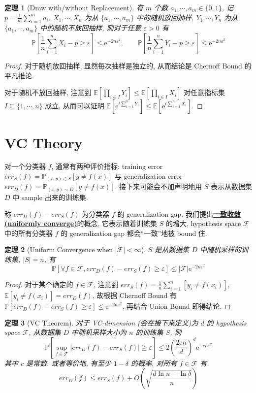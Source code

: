 \documentclass[8pt]{article}
\theoremstyle{compact}
\newtheorem{theorem}{定理}[section]
\def\obj#1{\textbf{\uline{#1}}}
\def\le{\leqslant}
\def\ge{\geqslant}
\def\P#1{\mathbb{P}\left[{#1}\right]}
\def\E#1{\mathbb{E}\left[{#1}\right]}
\def\e{\mathrm{e}}
\begin{document}
\begin{theorem}[Draw with/without Replacement]
	有 $m$ 个数 $a_1, \cdots, a_m \in \{0, 1\}$, 记 $p = \frac1m \sum\limits_{i=1}^{m}a_i$. $X_1, \cdots, X_n$ 为从 $\{a_1, \cdots, a_m\}$ 中的随机放回抽样, $Y_1, \cdots, Y_n$ 为从 $\{a_1, \cdots, a_m\}$ 中的随机不放回抽样, 则对于任意 $\varepsilon > 0$ 有
	$$\P{\frac1n \sum_{i=1}^{n}X_i - p \ge \varepsilon} \le \e^{-2n\varepsilon^2}, \qquad \P{\frac1n \sum_{i=1}^{n}Y_i - p \ge \varepsilon} \le \e^{-2n\varepsilon^2}$$
	\label{draw-w-replacement}
\end{theorem}
\begin{proof}
	对于随机放回抽样, 显然每次抽样是独立的, 从而结论是 Chernoff Bound 的平凡推论.

	对于随机不放回抽样, 注意到 $\E{\prod_{i \in I}Y_i} \le \E{\prod_{i \in I}X_i}$ 对任意指标集 $I \subseteq \{1, \cdots, n\}$ 成立, 从而可以证明 $\E{\e^{t\sum_{i=1}^nY_i}} \le \E{\e^{t\sum_{i=1}^nX_i}}$.
\end{proof}
\newpage
\section{VC Theory}
对一个分类器 $f$, 通常有两种评价指标: training error $err_S(f) = \mathbb P_{(x, y) \in S}[y \neq f(x)]$ 与 generalization error $err_D(f) = \mathbb P_{(x, y) \sim D}[y \neq f(x)]$. 接下来可能会不加声明地用 $S$ 表示从数据集 $D$ 中 sample 出来的训练集.

称 $err_D(f) - err_S(f)$ 为分类器 $f$ 的 generalization gap. 我们提出\obj{一致收敛(uniformly converge)}的概念, 它表示随着训练集 $S$ 的增大, hypothesis space $\mathcal F$ 中的所有分类器 $f$ 的 generalization gap 都会“一致”地被 bound 住.

\begin{theorem}[Uniform Convergence when $|\mathcal F| < \infty$]
	$S$ 是从数据集 $D$ 中随机采样的训练集, $|S| = n$, 有 $$\P{\forall f \in \mathcal F, err_D(f) - err_S(f) \ge \varepsilon} \le |\mathcal F|\e^{-2n\varepsilon^2}$$
\end{theorem}
\begin{proof}
	对于某个确定的 $f \in \mathcal F$, 注意到 $err_S(f) = \frac1n \sum_{i=1}^n[y_i \neq f(x_i)]$, $\E{y_i \neq f(x_i)} = err_D(f)$, 故根据 Chernoff Bound 有 $\P{err_D(f) - err_S(f) \ge \varepsilon} \le \e^{-2n\varepsilon^2}$. 再结合 Union Bound 即得结论.
\end{proof}
\begin{theorem}[VC Theorem]
	对于 VC-dimension (会在接下来定义)为 $d$ 的 hypothesis space $\mathcal F$, 从数据集 $D$ 中随机采样大小为 $n$ 的训练集 $S$, 则 $$\P{\sup_{f \in \mathcal F}|err_D(f) - err_S(f)| \ge \varepsilon} \le 2\left(\frac{2\e n}{d}\right)^d\e^{-cn\varepsilon^2}$$其中 $c$ 是常数. 或者等价地, 有至少 $1 - \delta$ 的概率, 对所有 $f \in \mathcal F$ 有 $$err_D(f) \le err_S(f) + O\left(\sqrt{\frac{d\ln n - \ln \delta}{n}}\right)$$
	\label{VC-theorem}
\end{theorem}
\end{document}
